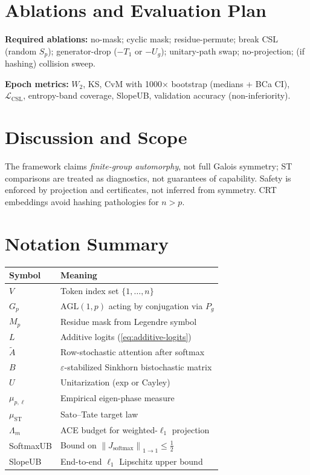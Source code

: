 \documentclass[11pt]{article}
\theoremstyle{remark}
\newcommand{\Norm}[2]{\left\lVert #1 \right\rVert_{#2}}
\newcommand{\ST}{\mathrm{ST}}
\newcommand{\softmax}{\operatorname{softmax}}
\begin{document}
\section{Ablations and Evaluation Plan}

\textbf{Required ablations:} no-mask; cyclic mask; residue-permute; break CSL (random $S_p$); generator-drop ($-T_1$ or $-U_g$); unitary-path swap; no-projection; (if hashing) collision sweep.

\textbf{Epoch metrics:} $W_2$, KS, CvM with 1000× bootstrap (medians + BCa CI), $\mathcal L_{\mathrm{CSL}}$, entropy-band coverage, SlopeUB, validation accuracy (non-inferiority).

\section{Discussion and Scope}

The framework claims \emph{finite-group automorphy}, not full Galois symmetry; ST comparisons are treated as diagnostics, not guarantees of capability. Safety is enforced by projection and certificates, not inferred from symmetry. CRT embeddings avoid hashing pathologies for $n>p$.

\appendix
\section{Notation Summary}
\begin{tabular}{ll}
\toprule
Symbol & Meaning \\
\midrule
$V$ & Token index set $\{1,\dots,n\}$ \\
$G_p$ & $\mathrm{AGL}(1,p)$ acting by conjugation via $P_g$ \\
$M_p$ & Residue mask from Legendre symbol \\
$L$ & Additive logits (\cref{eq:additive-logits}) \\
$\widetilde A$ & Row-stochastic attention after softmax \\
$B$ & $\varepsilon$-stabilized Sinkhorn bistochastic matrix \\
$U$ & Unitarization (exp or Cayley) \\
$\mu_{p,\ell}$ & Empirical eigen-phase measure \\
$\mu_{\ST}$ & Sato--Tate target law \\
$\Lambda_m$ & ACE budget for weighted-$\ell_1$ projection \\
SoftmaxUB & Bound on $\Norm{J_{\softmax}}{1\to 1}\le \tfrac12$ \\
SlopeUB & End-to-end $\ell_1$ Lipschitz upper bound \\
\bottomrule
\end{tabular}
\end{document}
